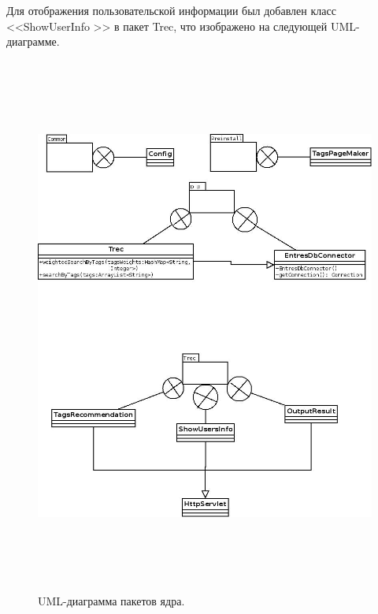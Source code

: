 Для отображения пользовательской информации был добавлен класс <<ShowUserInfo
>> в пакет Trec, что изображено на следующей UML-диаграмме.
\begin{figure}
\caption{UML-диаграмма пакетов ядра.}
\begin{center}
  \includegraphics[width=7in,height=7in]{pics/core-packs-ml.jpeg}
\end{center}
\end{figure}

